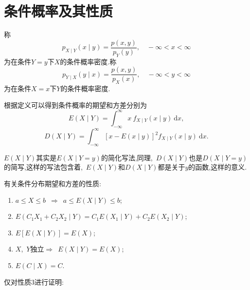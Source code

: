 \documentclass[cn,10pt,citestyle=gb7714-2015,bibstyle=gb7714-2015]{elegantbook}
\newcommand{\md}{\ \mathrm{d}}
\begin{document}
\section{条件概率及其性质}
\begin{definition}[连续型随机变量的条件分布]\label{def:rv-cond}
  称
  \[
      p_{X\mid Y}(x\mid y)=\frac{p(x,y)}{p_{Y}(y)},\quad -\infty<x<\infty
  \]
  为在条件$Y=y$下$X$的条件概率密度.称
  \[
      p_{Y\mid X}(y\mid x)=\frac{p(x,y)}{p_{X}(x)},\quad -\infty<y<\infty
  \]  
  为在条件$X=x$下$Y$的条件概率密度.
\end{definition}
根据定义可以得到条件概率的期望和方差分别为
\begin{equation}\label{eq:cond-E}
  E(X\mid Y)=\int_{-\infty}^\infty x\ f_{X\mid Y}(x\mid y)\md x,
\end{equation}
\begin{equation}\label{eq:cond-D}
  D(X\mid Y)=\int_{-\infty}^\infty\left[x-E(x\mid y)\right]^2f_{X\mid Y}(x\mid y)\md x.
\end{equation}
\begin{note}
  $E(X\mid Y)$其实是$E(X\mid Y=y)$的简化写法,同理,\ $D(X\mid Y)$也是$D(X\mid Y=y)$
  的简写,这样的写法包含着,\ $E(X\mid Y)$和$D(X\mid Y)$都是关于$y$的函数,这样的意义.
\end{note}
\begin{property}有关条件分布期望和方差的性质:
  \begin{enumerate}
    \item $a\leqslant X\leqslant b$\ $\Rightarrow$\ $a\leqslant E(X\mid Y)\leqslant b$;
    \item $E(C_1X_1+C_2X_2\mid Y)=C_1E(X_1\mid Y)+C_2E(X_2\mid Y)$;
    \item $E\left[E(X\mid Y)\right]=E(X)$;
    \item $X$,\ $Y$独立$\Rightarrow$\ $E(X\mid Y)=E(X)$;
    \item $E(C\mid X)=C$.
  \end{enumerate}
\end{property}
仅对性质3进行证明:
\end{document}
